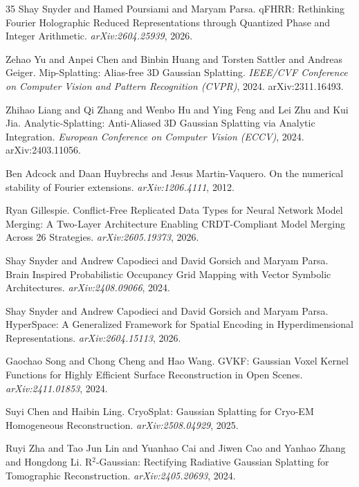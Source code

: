 \documentclass[11pt]{article}
\begin{document}
\begin{thebibliography}{35}
Shay Snyder and Hamed Poursiami and Maryam Parsa.
\newblock qFHRR: Rethinking Fourier Holographic Reduced Representations
through Quantized Phase and Integer Arithmetic.
\newblock \emph{arXiv:2604.25939}, 2026.

Zehao Yu and Anpei Chen and Binbin Huang and Torsten Sattler and Andreas
Geiger.
\newblock Mip-Splatting: Alias-free 3D Gaussian Splatting.
\newblock \emph{IEEE/CVF Conference on Computer Vision and Pattern
Recognition (CVPR)}, 2024.
\newblock arXiv:2311.16493.

Zhihao Liang and Qi Zhang and Wenbo Hu and Ying Feng and Lei Zhu and Kui
Jia.
\newblock Analytic-Splatting: Anti-Aliased 3D Gaussian Splatting via
Analytic Integration.
\newblock \emph{European Conference on Computer Vision (ECCV)}, 2024.
\newblock arXiv:2403.11056.

Ben Adcock and Daan Huybrechs and Jesus Martin-Vaquero.
\newblock On the numerical stability of Fourier extensions.
\newblock \emph{arXiv:1206.4111}, 2012.

Ryan Gillespie.
\newblock Conflict-Free Replicated Data Types for Neural Network Model
Merging: A Two-Layer Architecture Enabling CRDT-Compliant Model Merging
Across 26 Strategies.
\newblock \emph{arXiv:2605.19373}, 2026.

Shay Snyder and Andrew Capodieci and David Gorsich and Maryam Parsa.
\newblock Brain Inspired Probabilistic Occupancy Grid Mapping with
Vector Symbolic Architectures.
\newblock \emph{arXiv:2408.09066}, 2024.

Shay Snyder and Andrew Capodieci and David Gorsich and Maryam Parsa.
\newblock HyperSpace: A Generalized Framework for Spatial Encoding in
Hyperdimensional Representations.
\newblock \emph{arXiv:2604.15113}, 2026.

Gaochao Song and Chong Cheng and Hao Wang.
\newblock GVKF: Gaussian Voxel Kernel Functions for Highly Efficient
Surface Reconstruction in Open Scenes.
\newblock \emph{arXiv:2411.01853}, 2024.

Suyi Chen and Haibin Ling.
\newblock CryoSplat: Gaussian Splatting for Cryo-EM Homogeneous
Reconstruction.
\newblock \emph{arXiv:2508.04929}, 2025.

Ruyi Zha and Tao Jun Lin and Yuanhao Cai and Jiwen Cao and Yanhao Zhang
and Hongdong Li.
\newblock R$^2$-Gaussian: Rectifying Radiative Gaussian Splatting for
Tomographic Reconstruction.
\newblock \emph{arXiv:2405.20693}, 2024.


\end{thebibliography}
\end{document}
